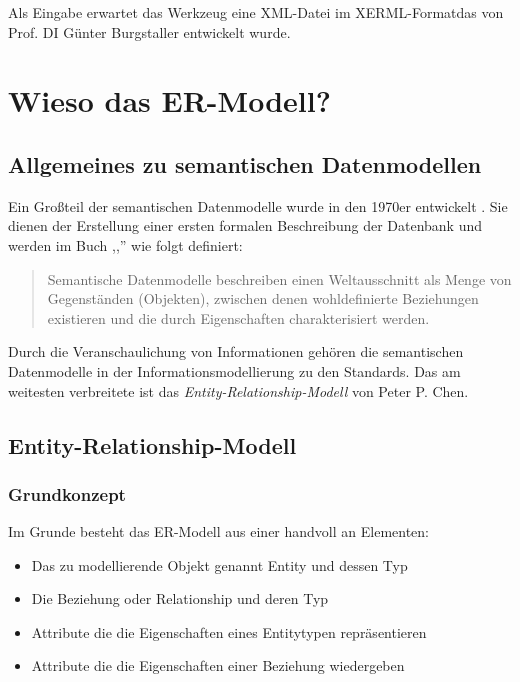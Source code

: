 \noindent
Als Eingabe erwartet das Werkzeug eine XML-Datei im XERML-Formatdas von Prof. DI Günter Burgstaller entwickelt wurde.

\chapter{Wieso das ER-Modell?}
\label{cha:Wieso das ER-Modell?}
\prc
\section{Allgemeines zu semantischen Datenmodellen}

Ein Großteil der semantischen Datenmodelle wurde in den 1970er entwickelt . Sie dienen der Erstellung einer ersten formalen Beschreibung der Datenbank und werden im Buch ,,'' wie folgt definiert:

\begin{quote}
	Semantische Datenmodelle beschreiben einen Weltausschnitt als Menge von Gegenständen (Objekten), zwischen denen wohldefinierte Beziehungen existieren und die durch Eigenschaften charakterisiert werden.
\end{quote}

\noindent
Durch die Veranschaulichung von Informationen gehören die semantischen Datenmodelle in der Informationsmodellierung zu den Standards. Das am weitesten verbreitete ist das \textit{Entity-Relationship-Modell} von Peter P. Chen\footnotemark[1]. 

\section{Entity-Relationship-Modell}

\subsection{Grundkonzept}

Im Grunde besteht das ER-Modell aus einer handvoll an Elementen:
\begin{itemize}
	\item Das zu modellierende Objekt genannt Entity und dessen Typ
	\item Die Beziehung oder Relationship und deren Typ
	\item Attribute die die Eigenschaften eines Entitytypen repräsentieren
	\item Attribute die die Eigenschaften einer Beziehung wiedergeben	
\end{itemize}

